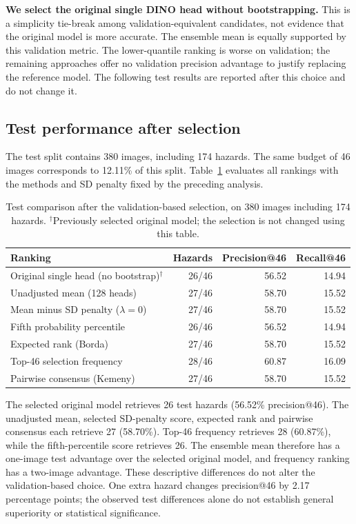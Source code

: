 \documentclass[10pt,a4paper]{article}
\begin{document}
\textbf{We select the original single DINO head without bootstrapping.}
This is a simplicity tie-break among validation-equivalent candidates, not evidence
that the original model is more accurate. The ensemble mean is equally supported
by this validation metric. The lower-quantile ranking is worse on validation;
the remaining approaches offer no validation precision advantage to justify
replacing the reference model. The following test results are reported after this
choice and do not change it.

\subsection{Test performance after selection}
\label{sec:test}
The test split contains 380 images, including 174 hazards. The same budget of 46
images corresponds to 12.11\% of this split. Table~\ref{tab:test} evaluates all
rankings with the methods and SD penalty fixed by the preceding analysis.
\begin{table}[H]
\centering
\caption{Test comparison after the validation-based selection, on 380 images including 174 hazards. $^{\dagger}$Previously selected original model; the selection is not changed using this table.}
\label{tab:test}
\small
\begin{tabular}{lrrr}
\toprule
Ranking & Hazards & Precision@46 & Recall@46 \\
\midrule
Original single head (no bootstrap)$^{\dagger}$ & 26/46 & 56.52 & 14.94 \\
Unadjusted mean (128 heads) & 27/46 & 58.70 & 15.52 \\
Mean minus SD penalty ($\lambda=0$) & 27/46 & 58.70 & 15.52 \\
Fifth probability percentile & 26/46 & 56.52 & 14.94 \\
Expected rank (Borda) & 27/46 & 58.70 & 15.52 \\
Top-46 selection frequency & 28/46 & 60.87 & 16.09 \\
Pairwise consensus (Kemeny) & 27/46 & 58.70 & 15.52 \\
\bottomrule
\end{tabular}
\end{table}

The selected original model retrieves 26 test hazards (56.52\% precision@46).
The unadjusted mean, selected SD-penalty score, expected rank and pairwise
consensus each retrieve 27 (58.70\%). Top-46 frequency retrieves 28 (60.87\%),
while the fifth-percentile score retrieves 26. The ensemble mean therefore has a
one-image test advantage over the selected original model, and frequency ranking
has a two-image advantage. These descriptive differences do not alter the
validation-based choice. One extra hazard changes precision@46 by 2.17 percentage
points; the observed test differences alone do not establish general superiority
or statistical significance.
\end{document}
